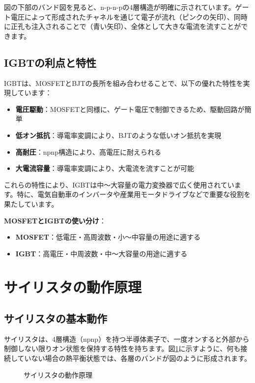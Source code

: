 図の下部のバンド図を見ると、n-p-n-pの4層構造が明確に示されています。ゲート電圧によって形成されたチャネルを通じて電子が流れ（ピンクの矢印）、同時に正孔も注入されることで（青い矢印）、全体として大きな電流を流すことができます。

\subsection{IGBTの利点と特性}

IGBTは、MOSFETとBJTの長所を組み合わせることで、以下の優れた特性を実現しています：

\begin{itemize}
\item \textbf{電圧駆動}：MOSFETと同様に、ゲート電圧で制御できるため、駆動回路が簡単
\item \textbf{低オン抵抗}：導電率変調により、BJTのような低いオン抵抗を実現
\item \textbf{高耐圧}：npnp構造により、高電圧に耐えられる
\item \textbf{大電流容量}：導電率変調により、大電流を流すことが可能
\end{itemize}

これらの特性により、IGBTは中～大容量の電力変換器で広く使用されています。特に、電気自動車のインバータや産業用モータドライブなどで重要な役割を果たしています。

\textbf{MOSFETとIGBTの使い分け}：

\begin{itemize}
\item \textbf{MOSFET}：低電圧・高周波数・小～中容量の用途に適する
\item \textbf{IGBT}：高電圧・中周波数・中～大容量の用途に適する
\end{itemize}

\section{サイリスタの動作原理}

\subsection{サイリスタの基本動作}

サイリスタは、4層構造（npnp）を持つ半導体素子で、一度オンすると外部から制御しない限りオン状態を保持する特性を持ちます。図\ref{fig:thyristor}に示すように、何も接続していない場合の熱平衡状態では、各層のバンドが図のように形成されます。

\begin{figure}[H]
\centering
{}
\caption{サイリスタの動作原理}
\label{fig:thyristor}
\end{figure}


